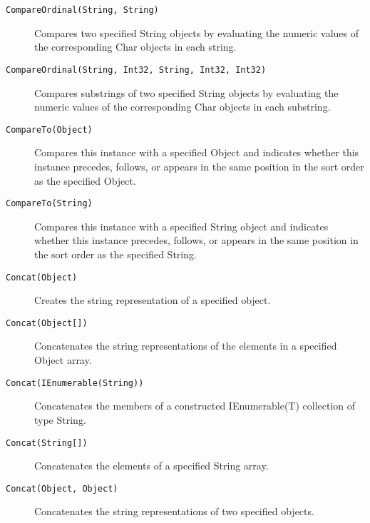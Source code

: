 \begin{description}
\item[\texttt{CompareOrdinal(String, String)}] Compares two specified String objects by evaluating the numeric values of the corresponding Char objects in each string.
\item[\texttt{CompareOrdinal(String, Int32, String, Int32, Int32)}] Compares substrings of two specified String objects by evaluating the numeric values of the corresponding Char objects in each substring.
\item[\texttt{CompareTo(Object)}] Compares this instance with a specified Object and indicates whether this instance precedes, follows, or appears in the same position in the sort order as the specified Object.
\item[\texttt{CompareTo(String)}] Compares this instance with a specified String object and indicates whether this instance precedes, follows, or appears in the same position in the sort order as the specified String.
\item[\texttt{Concat(Object)}] Creates the string representation of a specified object.
\item[\texttt{Concat(Object[])}] Concatenates the string representations of the elements in a specified Object array.
\item[\texttt{Concat(IEnumerable(String))}] Concatenates the members of a constructed IEnumerable(T) collection of type String.
\item[\texttt{Concat(String[])}] Concatenates the elements of a specified String array.
\item[\texttt{Concat(Object, Object)}] Concatenates the string representations of two specified objects.

\end{description}
